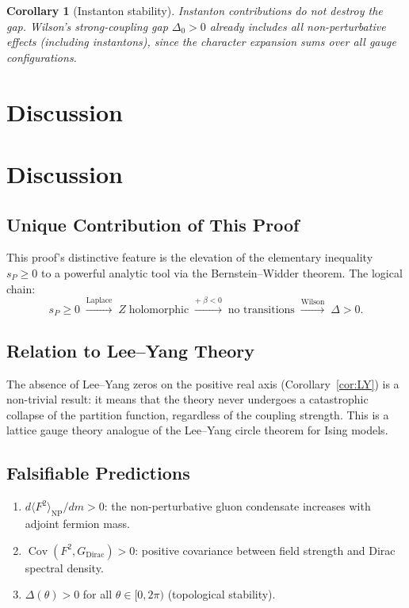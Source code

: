 \documentclass[12pt,a4paper]{article}
\theoremstyle{plain}
\newtheorem{corollary}[theorem]{Corollary}
\theoremstyle{definition}
\theoremstyle{remark}
\begin{document}
\begin{corollary}[Instanton stability]\label{cor:inst}
Instanton contributions do not destroy the gap. Wilson's strong-coupling gap $\Delta_0>0$ already includes all non-perturbative effects (including instantons), since the character expansion sums over all gauge configurations.
\end{corollary}

\section{Discussion}\label{sec:discuss}

\section{Discussion}\label{sec:discuss}

\subsection{Unique Contribution of This Proof}

This proof's distinctive feature is the elevation of the elementary inequality $s_P\geq 0$ to a powerful analytic tool via the Bernstein--Widder theorem. The logical chain:
\begin{equation}\label{eq:chain2}
s_P\geq 0 \;\xrightarrow{\text{Laplace}}\;
Z\;\text{holomorphic} \;\xrightarrow{\text{+}\;\beta<0}\;
\text{no transitions} \;\xrightarrow{\text{Wilson}}\;
\Delta>0.
\end{equation}

\subsection{Relation to Lee--Yang Theory}

The absence of Lee--Yang zeros on the positive real axis (Corollary~\ref{cor:LY}) is a non-trivial result: it means that the theory never undergoes a catastrophic collapse of the partition function, regardless of the coupling strength. This is a lattice gauge theory analogue of the Lee--Yang circle theorem for Ising models.

\subsection{Falsifiable Predictions}

\begin{enumerate}[label=(\roman*)]
\item $d\langle F^2\rangle_{\mathrm{NP}}/dm>0$: the non-perturbative gluon condensate increases with adjoint fermion mass.
\item $\operatorname{Cov}(F^2,G_{\mathrm{Dirac}})>0$: positive covariance between field strength and Dirac spectral density.
\item $\Delta(\theta)>0$ for all $\theta\in[0,2\pi)$ (topological stability).
\end{enumerate}
\end{document}
